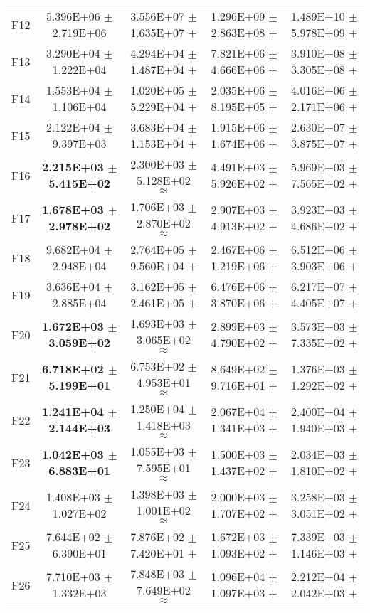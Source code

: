 \documentclass[paper]{ieice}
\begin{document}
\begin{table*}[htbp]
\begin{tabular}{c|c|c|c|c}
		F12	&	5.396E+06	$\pm$	2.719E+06		&	3.556E+07	$\pm$	1.635E+07	$+$	&	1.296E+09	$\pm$	2.863E+08	$+$	&	1.489E+10	$\pm$	5.978E+09	$+$	\\
		F13	&	3.290E+04	$\pm$	1.222E+04		&	4.294E+04	$\pm$	1.487E+04	$+$	&	7.821E+06	$\pm$	4.666E+06	$+$	&	3.910E+08	$\pm$	3.305E+08	$+$	\\
		F14	&	1.553E+04	$\pm$	1.106E+04		&	1.020E+05	$\pm$	5.229E+04	$+$	&	2.035E+06	$\pm$	8.195E+05	$+$	&	4.016E+06	$\pm$	2.171E+06	$+$	\\
		F15	&	2.122E+04	$\pm$	9.397E+03		&	3.683E+04	$\pm$	1.153E+04	$+$	&	1.915E+06	$\pm$	1.674E+06	$+$	&	2.630E+07	$\pm$	3.875E+07	$+$	\\
		F16	&	\textbf{2.215E+03	$\pm$	5.415E+02}		&	2.300E+03	$\pm$	5.128E+02	$\approx$	&	4.491E+03	$\pm$	5.926E+02	$+$	&	5.969E+03	$\pm$	7.565E+02	$+$	\\
		F17	&	\textbf{1.678E+03	$\pm$	2.978E+02}		&	1.706E+03	$\pm$	2.870E+02	$\approx$	&	2.907E+03	$\pm$	4.913E+02	$+$	&	3.923E+03	$\pm$	4.686E+02	$+$	\\
		F18	&	9.682E+04	$\pm$	2.948E+04		&	2.764E+05	$\pm$	9.560E+04	$+$	&	2.467E+06	$\pm$	1.219E+06	$+$	&	6.512E+06	$\pm$	3.903E+06	$+$	\\
		F19	&	3.636E+04	$\pm$	2.885E+04		&	3.162E+05	$\pm$	2.461E+05	$+$	&	6.476E+06	$\pm$	3.870E+06	$+$	&	6.217E+07	$\pm$	4.405E+07	$+$	\\
		F20	&	\textbf{1.672E+03	$\pm$	3.059E+02}		&	1.693E+03	$\pm$	3.065E+02	$\approx$	&	2.899E+03	$\pm$	4.790E+02	$+$	&	3.573E+03	$\pm$	7.335E+02	$+$	\\
		F21	&	\textbf{6.718E+02	$\pm$	5.199E+01}		&	6.753E+02	$\pm$	4.953E+01	$\approx$	&	8.649E+02	$\pm$	9.716E+01	$+$	&	1.376E+03	$\pm$	1.292E+02	$+$	\\
		F22	&	\textbf{1.241E+04	$\pm$	2.144E+03}		&	1.250E+04	$\pm$	1.418E+03	$\approx$	&	2.067E+04	$\pm$	1.341E+03	$+$	&	2.400E+04	$\pm$	1.940E+03	$+$	\\
		F23	&	\textbf{1.042E+03	$\pm$	6.883E+01}		&	1.055E+03	$\pm$	7.595E+01	$\approx$	&	1.500E+03	$\pm$	1.437E+02	$+$	&	2.034E+03	$\pm$	1.810E+02	$+$	\\
		F24	&	1.408E+03	$\pm$	1.027E+02		&	1.398E+03	$\pm$	1.001E+02	$\approx$	&	2.000E+03	$\pm$	1.707E+02	$+$	&	3.258E+03	$\pm$	3.051E+02	$+$	\\
		F25	&	7.644E+02	$\pm$	6.390E+01		&	7.876E+02	$\pm$	7.420E+01	$+$	&	1.672E+03	$\pm$	1.093E+02	$+$	&	7.339E+03	$\pm$	1.146E+03	$+$	\\
		F26	&	7.710E+03	$\pm$	1.332E+03		&	7.848E+03	$\pm$	7.649E+02	$\approx$	&	1.096E+04	$\pm$	1.097E+03	$+$	&	2.212E+04	$\pm$	2.042E+03	$+$	\\

\end{tabular}
\end{table*}
\end{document}
